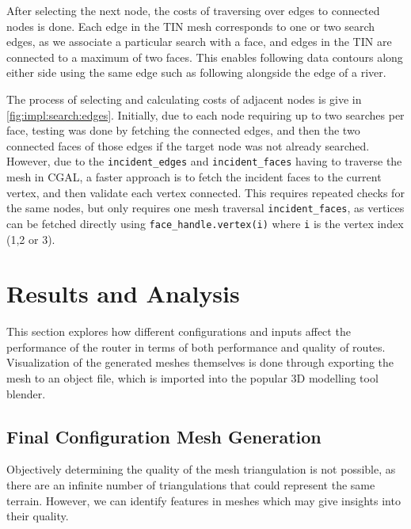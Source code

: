 \documentclass[12pt]{article}
\begin{document}
After selecting the next node, the costs of traversing over edges to connected nodes is done. Each edge in the TIN mesh corresponds to one or two search edges, as we associate a particular search with a face, and edges in the TIN are connected to a maximum of two faces. This enables following data contours along either side using the same edge such as following alongside the edge of a river.

The process of selecting and calculating costs of adjacent nodes is give in \autoref{fig:impl:search:edges}. Initially, due to each node requiring up to two searches per face, testing was done by fetching the connected edges, and then the two connected faces of those edges if the target node was not already searched. However, due to the \texttt{incident\_edges} and \texttt{incident\_faces} having to traverse the mesh in CGAL, a faster approach is to fetch the incident faces to the current vertex, and then validate each vertex connected. This requires repeated checks for the same nodes, but only requires one mesh traversal \texttt{incident\_faces}, as vertices can be fetched directly using \texttt{face\_handle.vertex(i)} where \texttt{i} is the vertex index (1,2 or 3).

\section{Results and Analysis}

This section explores how different configurations and inputs affect the performance of the router in terms of both performance and quality of routes. Visualization of the generated meshes themselves is done through exporting the mesh to an object file, which is imported into the popular 3D modelling tool blender.

\subsection{Final Configuration Mesh Generation}

Objectively determining the quality of the mesh triangulation is not possible, as there are an infinite number of triangulations that could represent the same terrain. However, we can identify features in meshes which may give insights into their quality.
\end{document}
